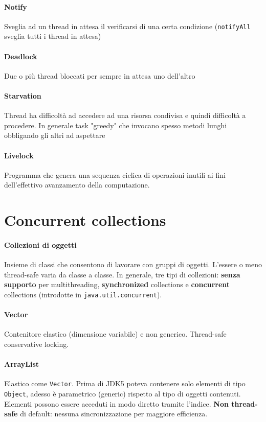 \documentclass[10pt]{article}
\begin{document}
\paragraph{Notify} Sveglia ad un thread in attesa il verificarsi di una certa condizione (\texttt{notifyAll} sveglia tutti i thread in attesa)
\paragraph{Deadlock} Due o più thread bloccati per sempre in attesa uno dell'altro
\paragraph{Starvation} Thread ha difficoltà ad accedere ad una risorsa condivisa e quindi difficoltà a procedere. In generale task "greedy" che invocano spesso metodi lunghi obbligando gli altri ad aspettare
\paragraph{Livelock} Programma che genera una sequenza ciclica di operazioni inutili ai fini dell'effettivo avanzamento della computazione.
\section{Concurrent collections}
\paragraph{Collezioni di oggetti} Insieme di classi che consentono di lavorare con gruppi di oggetti. L'essere o meno thread-safe varia da classe a classe. In generale, tre tipi di collezioni: \textbf{senza supporto} per multithreading, \textbf{synchronized} collections e \textbf{concurrent} collections (introdotte in \texttt{java.util.concurrent}).
\paragraph{Vector} Contenitore elastico (dimensione variabile) e non generico. Thread-safe conservative locking.
\paragraph{ArrayList} Elastico come \texttt{Vector}. Prima di JDK5 poteva contenere solo elementi di tipo \texttt{Object}, adesso è parametrico (generic) rispetto al tipo di oggetti contenuti.\\Elementi possono essere acceduti in modo diretto tramite l'indice. \textbf{Non thread-safe} di default: nessuna sincronizzazione per maggiore efficienza.
\end{document}

